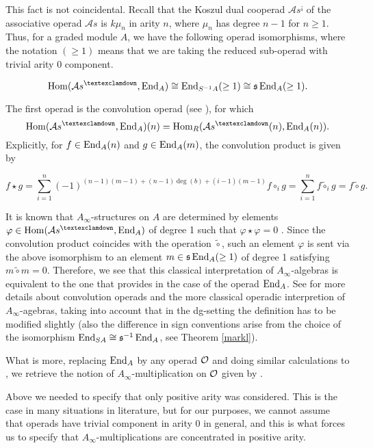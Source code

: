 \documentclass[Thesis.tex]{subfiles}
\begin{document}
This fact is not coincidental. Recall that the Koszul dual cooperad $\mathcal{A}s^{¡}$ of the associative operad $\mathcal{A}s$ is $k\mu_n$ in arity $n$, where $\mu_n$ has degree $n-1$ for $n\geq 1$. Thus, for a graded module $A$, we have the following operad isomorphisms, where the notation $(\geq 1)$ means that we are taking the reduced sub-operad with trivial arity 0 component.


\[\Hom(\mathcal{A}s^{¡},\End_A)\cong \End_{S^{-1}A}(\geq 1)\cong\s\End_A(\geq 1).\]
 
The first operad is the convolution operad (see \cite[\S 6.4.1]{lodayvallette}), for which \[\Hom(\mathcal{A}s^{¡},\End_A)(n)=\Hom_R(\mathcal{A}s^{¡}(n),\End_A(n)).\] Explicitly, for $f\in\operatorname{End}_A(n)$ and $g\in\operatorname{End}_A(m)$, the convolution product is given by

\[f\star g=\sum_{i=1}^n(-1)^{(n-1)(m-1)+(n-1)\deg(b)+(i-1)(m-1)}f\circ_i g=\sum_{i=1}^nf\tilde{\circ}_i g=f\tilde{\circ}g.\]

It is known that $A_\infty$-structures on $A$ are determined by elements $\varphi\in\Hom(\mathcal{A}s^{¡},\End_A)$ of degree 1 such that $\varphi\star \varphi=0$ \cite[Proposition 10.1.3]{lodayvallette}. Since the convolution product coincides with the operation $\tilde{\circ}$, such an element $\varphi$ is sent via the above isomorphism to an element $m\in\mathfrak{s}\operatorname{End}_A(\geq 1)$ of degree 1 satisfying $m\tilde{\circ}m=0$. Therefore, we see that this classical interpretation of $A_\infty$-algebras is equivalent to the one that   provides in the case of the operad $\operatorname{End}_A$. See \cite[Proposition 10.1.11]{lodayvallette} for more details about convolution operads and the more classical operadic interpretion of $A_\infty$-agebras,  taking into account that in the dg-setting the definition has to be modified slightly (also the difference in sign conventions arise from the choice of the isomorphism $\operatorname{End}_{SA}\cong\mathfrak{s}^{-1}\operatorname{End}_A$, see Theorem \ref{markl}).

What is more, replacing $\operatorname{End}_A$ by any operad ${\mathcal O}$ and doing similar calculations to \cite[Proposition 10.1.11]{lodayvallette}, we retrieve the notion of $A_\infty$-multiplication on ${\mathcal O}$ given by .

\begin{remark}
Above we needed to specify that only positive arity was considered. This is the case in many situations in literature, but for our purposes, we cannot assume that operads have trivial component in arity 0 in general, and this is what forces us to specify that $A_\infty$-multiplications are concentrated in positive arity.
\end{remark}
\end{document}
